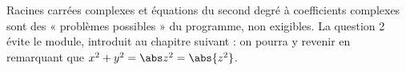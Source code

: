 \begin{teachernote}
Racines carrées complexes et équations du second degré à coefficients complexes sont des « problèmes possibles » du programme, non exigibles. La question 2 évite le module, introduit au chapitre suivant : on pourra y revenir en remarquant que $x^2+y^2=\abs z^2=\abs{z^2}$.
\end{teachernote}
